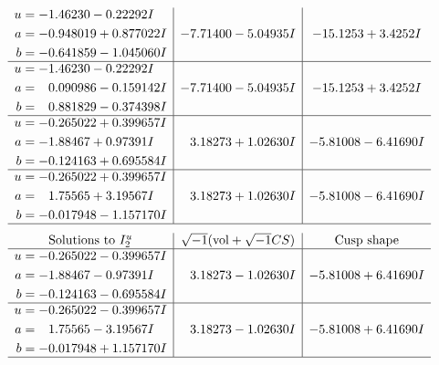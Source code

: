 \documentclass[1p]{elsarticle_modified}
\theoremstyle{definition}
\newcommand{\I}{\sqrt{-1}}
\begin{document}
$$\begin{array}{c|c|c}
\begin{aligned}
u &= -1.46230 - 0.22292 I \\
a &= -0.948019 + 0.877022 I \\
b &= -0.641859 - 1.045060 I\end{aligned}
 & -7.71400 - 5.04935 I & -15.1253 + 3.4252 I \\ \hline\begin{aligned}
u &= -1.46230 - 0.22292 I \\
a &= \phantom{-}0.090986 - 0.159142 I \\
b &= \phantom{-}0.881829 - 0.374398 I\end{aligned}
 & -7.71400 - 5.04935 I & -15.1253 + 3.4252 I \\ \hline\begin{aligned}
u &= -0.265022 + 0.399657 I \\
a &= -1.88467 + 0.97391 I \\
b &= -0.124163 + 0.695584 I\end{aligned}
 & \phantom{-}3.18273 + 1.02630 I & -5.81008 - 6.41690 I \\ \hline\begin{aligned}
u &= -0.265022 + 0.399657 I \\
a &= \phantom{-}1.75565 + 3.19567 I \\
b &= -0.017948 - 1.157170 I\end{aligned}
 & \phantom{-}3.18273 + 1.02630 I & -5.81008 - 6.41690 I\\
 \hline 
 \end{array}$$\newpage$$\begin{array}{c|c|c}  
\text{Solutions to }I^u_{2}& \I (\text{vol} + \sqrt{-1}CS) & \text{Cusp shape}\\
 \hline 
\begin{aligned}
u &= -0.265022 - 0.399657 I \\
a &= -1.88467 - 0.97391 I \\
b &= -0.124163 - 0.695584 I\end{aligned}
 & \phantom{-}3.18273 - 1.02630 I & -5.81008 + 6.41690 I \\ \hline\begin{aligned}
u &= -0.265022 - 0.399657 I \\
a &= \phantom{-}1.75565 - 3.19567 I \\
b &= -0.017948 + 1.157170 I\end{aligned}
 & \phantom{-}3.18273 - 1.02630 I & -5.81008 + 6.41690 I\\
 \hline 
 \end{array}$$\newpage\newpage\renewcommand{\arraystretch}{1}
\end{document}
